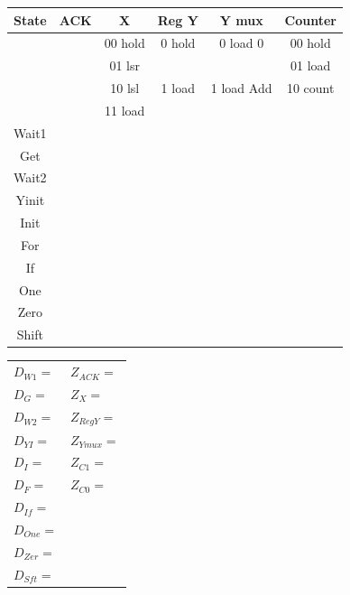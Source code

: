 \begin{description}
\begin{tabular}{c||c|c|c|c|c}  
State   & ACK       &   X         &  Reg Y    & Y mux         & Counter       \\ \hline
        &           &   00 hold   &  0 hold   & 0 load 0      & 00 hold       \\ \hline
        &           &   01 lsr    &           &               & 01 load       \\ \hline
        &           &   10 lsl    &  1 load   & 1 load Add    & 10 count      \\ \hline
        &           &   11 load   &           &               &               \\ \hline \hline
Wait1   &          &           &          &              &             \\ \hline
Get     &          &           &          &              &             \\ \hline
Wait2   &          &           &          &              &             \\ \hline
Yinit   &          &           &          &              &             \\ \hline
Init    &          &           &          &              &             \\ \hline
For     &          &           &          &              &             \\ \hline
If      &          &           &          &              &             \\ \hline
One     &          &           &          &              &             \\ \hline
Zero    &          &           &          &              &             \\ \hline
Shift   &          &           &          &              &             \\ 
\end{tabular}

\begin{tabular}{p{2in}p{1in}}
$D_{W1} =$	&	$Z_{ACK} =$  		\\
$D_{G} = $	&	$Z_{X} = $		\\
$D_{W2} =$	&	$Z_{RegY} =$  	\\
$D_{YI} =$ 	&	$Z_{Ymux} =$ 		\\
$D_{I} = $	&	$Z_{C1} =$ 		\\
$D_{F} = $	&	$Z_{C0} =$ 		\\
$D_{If} =$ 	&				\\
$D_{One} =$ 	&				\\
$D_{Zer} =$ 	&				\\
$D_{Sft} =$ 	&				\\
\end{tabular}


\end{description}
